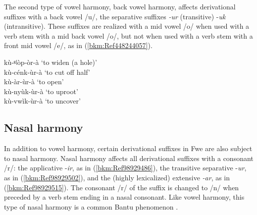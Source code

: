 \begin{table}
\label{bkm:Ref98929304}\caption{\label{tab:2:4}Vowel height harmony in CV verb roots}
\end{table}

The second type of vowel harmony, back vowel harmony, affects derivational suffixes with a back vowel /u/, the separative suffixes \textit{-ur} (transitive) -\textit{uk} (intransitive). These suffixes are realized with a mid vowel /o/ when used with a verb stem with a mid back vowel /o/, but not when used with a verb stem with a front mid vowel /e/, as in (\ref{bkm:Ref448244057}).

\newpage
\ea
\label{bkm:Ref448244057}
kù-ᵍǀòp-òr-à    ‘to widen (a hole)’\\
kù-cénk-ùr-à  ‘to cut off half’\\
kù-àr-ùr-à    ‘to open’\\
kù-nyùk-ùr-à  ‘to uproot’\\
kù-vwìk-ùr-à  ‘to uncover’
\z
\subsection{Nasal harmony}
\label{bkm:Ref70697295}\hypertarget{Toc75352615}{}\label{bkm:Ref70947851}\label{bkm:Ref70697565}
In addition to vowel harmony, certain derivational suffixes in Fwe are also subject to nasal harmony. Nasal harmony affects all derivational suffixes with a consonant /r/: the applica\-tive -\textit{ir}, as in (\ref{bkm:Ref98929486}), the transitive separative -\textit{ur}, as in (\ref{bkm:Ref98929502}), and the (highly lexicalized) extensive \textit{\-\nobreakdash-ar}, as in (\ref{bkm:Ref98929515}). The consonant /r/ of the suffix is changed to /n/ when preceded by a verb stem ending in a nasal consonant. Like vowel harmony, this type of nasal harmony is a common Bantu phenomenon \citep{Greenberg1951}.

